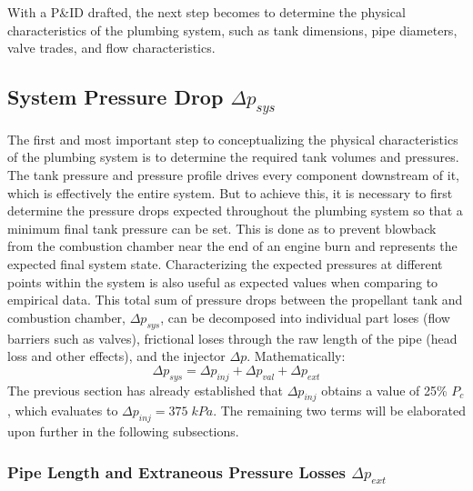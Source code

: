 \documentclass[9pt]{article} %
\numberwithin{equation}{section} %
\begin{document}
With a P\&ID drafted, the next step becomes to determine the physical characteristics of the plumbing system, such as tank dimensions, pipe diameters, valve trades, and flow characteristics.

\subsection{System Pressure Drop $\Delta p_{sys}$}

\hspace{\parindent} The first and most important step to conceptualizing the physical characteristics of the plumbing system is to determine the required tank volumes and pressures. The tank pressure and pressure profile drives every component downstream of it, which is effectively the entire system. But to achieve this, it is necessary to first determine the pressure drops expected throughout the plumbing system so that a minimum final tank pressure can be set. This is done as to prevent blowback from the combustion chamber near the end of an engine burn and represents the expected final system state. Characterizing the expected pressures at different points within the system is also useful as expected values when comparing to empirical data. This total sum of pressure drops between the propellant tank and combustion chamber, $\Delta p_{sys}$, can be decomposed into individual part loses (flow barriers such as valves), frictional loses through the raw length of the pipe (head loss and other effects), and the injector $\Delta p$. Mathematically:
\begin{equation} \label{eq:system_pressure_drop}
\Delta p_{sys} = \Delta p_{inj} + \Delta p_{val} + \Delta p_{ext}
\end{equation}
The previous section has already established that $\Delta p_{inj}$ obtains a value of 25\% $P_{c}$, which evaluates to $\Delta p_{inj} = 375 \; kPa$. The remaining two terms will be elaborated upon further in the following subsections.

\subsubsection[]{Pipe Length and Extraneous Pressure Losses $\Delta p_{ext}$ \protect\footnotemark} 
\end{document}
